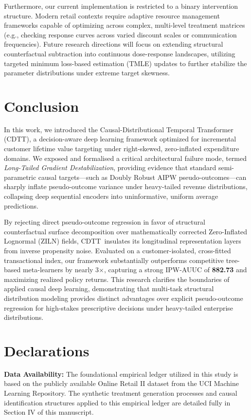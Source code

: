 \documentclass[10pt, conference]{IEEEtran}
\newcommand{\ourmodel}{CDTT}
\begin{document}
Furthermore, our current implementation is restricted to a binary intervention structure. Modern retail contexts require adaptive resource management frameworks capable of optimizing across complex, multi-level treatment matrices (e.g., checking response curves across varied discount scales or communication frequencies). Future research directions will focus on extending structural counterfactual subtraction into continuous dose-response landscapes, utilizing targeted minimum loss-based estimation (TMLE) updates to further stabilize the parameter distributions under extreme target skewness.

\vspace{-0.5em}
\section{Conclusion}
\label{sec:conclusion}

In this work, we introduced the Causal-Distributional Temporal Transformer (\ourmodel), a decision-aware deep learning framework optimized for incremental customer lifetime value targeting under right-skewed, zero-inflated expenditure domains. We exposed and formalised a critical architectural failure mode, termed \textit{Long-Tailed Gradient Destabilization}, providing evidence that standard semi-parametric causal targets—such as Doubly Robust AIPW pseudo-outcomes—can sharply inflate pseudo-outcome variance under heavy-tailed revenue distributions, collapsing deep sequential encoders into uninformative, uniform average predictions. 

By rejecting direct pseudo-outcome regression in favor of structural counterfactual surface decomposition over mathematically corrected Zero-Inflated Lognormal (ZILN) fields, \ourmodel\ insulates its longitudinal representation layers from inverse propensity noise. Evaluated on a customer-isolated, cross-fitted transactional index, our framework substantially outperforms competitive tree-based meta-learners by nearly 3$\times$, capturing a strong IPW-AUUC of \textbf{882.73} and maximizing realized policy returns. This research clarifies the boundaries of applied causal deep learning, demonstrating that multi-task structural distribution modeling provides distinct advantages over explicit pseudo-outcome regression for high-stakes prescriptive decisions under heavy-tailed enterprise distributions.

\vspace{-0.5em}
\section*{Declarations}
\textbf{Data Availability:} The foundational empirical ledger utilized in this study is based on the publicly available Online Retail II dataset \cite{Chen2012} from the UCI Machine Learning Repository. The synthetic treatment generation processes and causal identification structures applied to this empirical ledger are detailed fully in Section IV of this manuscript.
\end{document}
